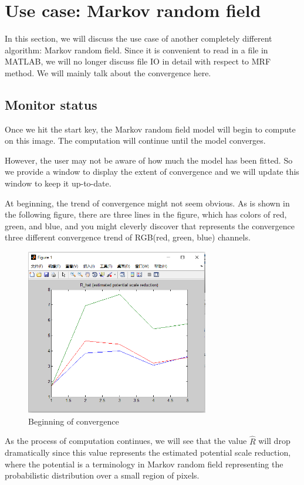 \section{Use case: Markov random field}
In this section, we will discuss the use case of another completely different algorithm: Markov random field. Since it is convenient to read in a file in MATLAB, we will no longer discuss file IO in detail with respect to MRF method. We will mainly talk about the convergence here.
\subsection{Monitor status}
Once we hit the start key, the Markov random field model will begin to compute on this image. The computation will continue until the model converges.

However, the user may not be aware of how much the model has been fitted. So we provide a window to display the extent of convergence and we will update this window to keep it up-to-date.

At beginning, the trend of convergence might not seem obvious. As is shown in the following figure, there are three lines in the figure, which has colors of red, green, and blue, and you might cleverly discover that represents the convergence three different convergence trend of RGB(red, green, blue) channels.

\begin{figure}[H]
\centering
\includegraphics[width=8cm]{mrf_beg.png}
\caption{Beginning of convergence}
\end{figure}

As the process of computation continues, we will see that the value $\hat{R}$ will drop dramatically since this value represents the estimated potential scale reduction, where the potential is a terminology in Markov random field representing the probabilistic distribution over a small region of pixels.

